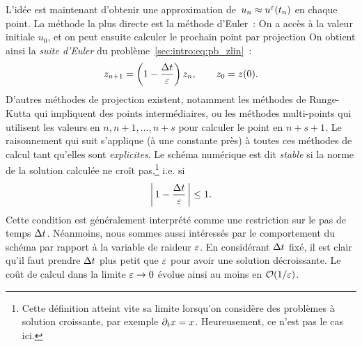 L'idée est maintenant d'obtenir une approximation de~$u_n \approx
u^{\varepsilon}(t_n)$ en chaque point. La méthode la plus directe est la méthode
d'Euler~: On a accès à la valeur initiale $u_0$, et on peut ensuite
calculer le prochain point par projection 
%
%
\noindent%
On obtient ainsi la \textit{suite d'Euler} du
problème~\eqref{sec:intro:eq:pb_zlin}~:
\begin{equation} \label{sec:intro:eq:euler}
    z_{n+1} = \left( 1 - \frac{\Delta t}{\varepsilon} \right) z_n , 
    \qquad
    z_0 = z(0) .
\end{equation}
D'autres méthodes de projection existent, notamment les méthodes de
Runge-Kutta qui impliquent des points intermédiaires, ou les méthodes
multi-points qui utilisent les valeurs en $n, n+1, \ldots, n+s$ pour
calculer le point en $n+s+1$. Le raisonnement qui suit s'applique (à une
constante près) à toutes ces méthodes de calcul tant qu'elles sont
\textit{explicites}. Le schéma numérique est dit \textit{stable} si la
norme de la solution calculée ne croît pas,\footnote{%
Cette définition atteint vite sa limite lorsqu'on considère des
problèmes à solution croissante, par exemple $\partial_t x = x$.
Heureusement, ce n'est pas le cas ici.} i.e. si 
\begin{equation*}
    \left|\, 1 - \frac{\Delta t}{\varepsilon} \,\right| \leq 1 .
\end{equation*}
Cette condition est généralement interprété comme une restriction sur le
pas de temps $\Delta t$. Néanmoins, nous sommes aussi intéressés par le
comportement du schéma par rapport à la variable de raideur $\varepsilon$. En
considérant $\Delta t$ fixé, il est clair qu'il faut prendre $\Delta t$ plus petit
que $\varepsilon$ pour avoir une solution décroissante. Le coût de calcul dans
la limite $\varepsilon \rightarrow 0$ évolue ainsi au moins en $\mathcal{O}(1/\varepsilon)$.

